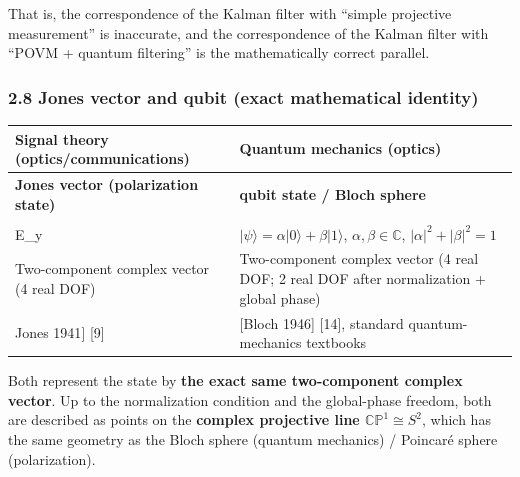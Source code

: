 \documentclass[
]{article}
\newcounter{none} %
\begin{document}
That is, the correspondence of the Kalman filter with ``simple
projective measurement'' is inaccurate, and the correspondence of the
Kalman filter with ``POVM + quantum filtering'' is the mathematically
correct parallel.

\subsubsection{2.8 Jones vector and qubit (exact mathematical
identity)}\label{jones-vector-and-qubit-exact-mathematical-identity}

{\def\LTcaptype{none} %
\begin{longtable}[]{@{}
  >{\raggedright\arraybackslash}p{}
  >{\raggedright\arraybackslash}p{}@{}}
\toprule\noalign{}
\begin{minipage}[b]{\linewidth}\raggedright
Signal theory (optics/communications)
\end{minipage} & \begin{minipage}[b]{\linewidth}\raggedright
Quantum mechanics (optics)
\end{minipage} \\
\midrule\noalign{}
\endhead
\bottomrule\noalign{}
\endlastfoot
\textbf{Jones vector (polarization state)} & \textbf{qubit state / Bloch
sphere} \\
\(|\psi\rangle = \begin{pmatrix} E_x \\ E_y \end{pmatrix}\),
\(E_x, E_y \in \mathbb{C}\) &
\(|\psi\rangle = \alpha|0\rangle + \beta|1\rangle\),
\(\alpha, \beta \in \mathbb{C}\), \(|\alpha|^2 + |\beta|^2 = 1\) \\
Two-component complex vector (4 real DOF) & Two-component complex vector
(4 real DOF; 2 real DOF after normalization + global phase) \\
{[}Jones 1941{]} {[}9{]} & {[}Bloch 1946{]} {[}14{]}, standard
quantum-mechanics textbooks \\
\end{longtable}
}

Both represent the state by \textbf{the exact same two-component complex
vector}. Up to the normalization condition and the global-phase freedom,
both are described as points on the \textbf{complex projective line
\(\mathbb{CP}^1\cong S^2\)}, which has the same geometry as the Bloch
sphere (quantum mechanics) / Poincaré sphere (polarization).
\end{document}
